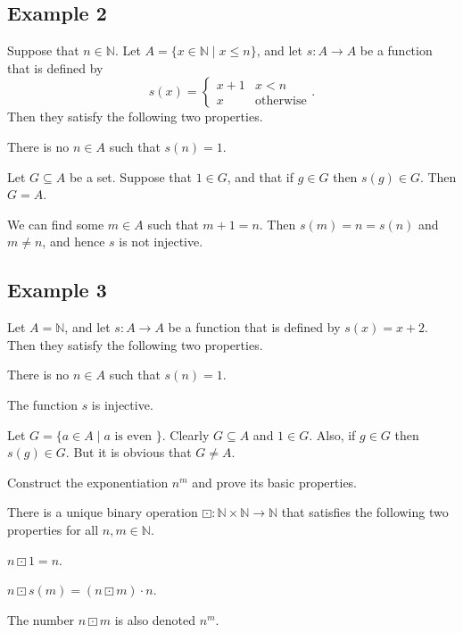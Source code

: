 \subsection*{Example 2}
Suppose that $n \in \mathbb{N}$. Let $A = \{ x \in \mathbb{N} \mid x \leq n \}$, and let $s: A \to A$ be a function that is defined by
\[
	s(x) = \begin{cases}
		x + 1 & x < n            \\
		x     & \text{otherwise}
	\end{cases}.
\]
Then they satisfy the following two properties.
\begin{lenumerate}
	\item There is no $n \in A$ such that $s(n) = 1$.
	\item Let $G \subseteq A$ be a set. Suppose that $1 \in G$, and that if $g \in G$ then $s(g) \in G$. Then
	      $G = A$.
\end{lenumerate}
We can find some $m \in A$ such that $m + 1 = n$. Then $s(m) = n = s(n)$ and $m \not= n$, and hence $s$ is not injective.

\subsection*{Example 3}
Let $A = \mathbb{N}$, and let $s: A \to A$ be a function that is defined by $s(x) = x + 2$. Then they satisfy the following two properties.
\begin{lenumerate}
	\item There is no $n \in A$ such that $s(n) = 1$.
	\item The function $s$ is injective.
\end{lenumerate}
Let $G = \{ a \in A \mid  a \text{ is even } \}$. Clearly $G \subseteq A$ and $1 \in G$. Also, if $g \in G$ then $s(g) \in G$. But it is obvious that $G \not= A$.


\Newpage
\begin{exercise} %
	Construct the exponentiation $n^m$ and prove its basic properties.
\end{exercise}

\begin{theorem}[Exponentiation]
	\label{nat:t:exp}
	There is a unique binary operation $\boxdot: \mathbb{N} \times \mathbb{N} \to \mathbb{N}$ that satisfies the following two properties for all $n, m \in \mathbb{N}$.
	\begin{lenumerate}
		\item \label{nat:t:exp:1}
		      $n \boxdot 1 = n$.
		\item \label{nat:t:exp:n}
		      $n \boxdot s(m) = (n \boxdot m) \cdot n$.
	\end{lenumerate}
	The number $n \boxdot m$ is also denoted $n^m$.
\end{theorem}

